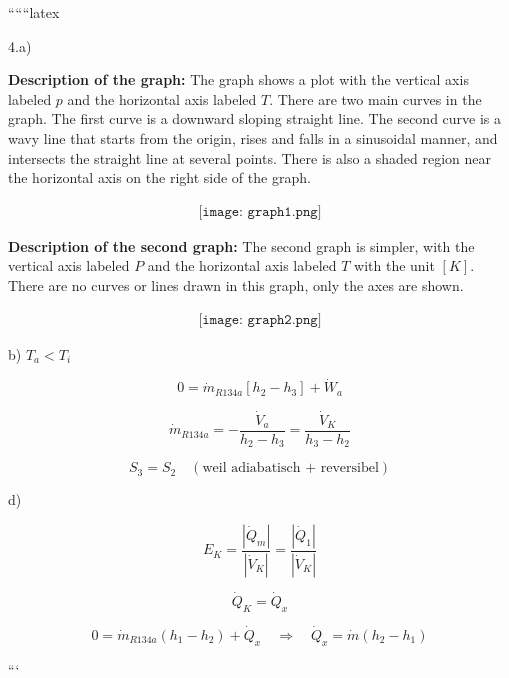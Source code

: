 
``````latex


4.a)

\textbf{Description of the graph:} The graph shows a plot with the vertical axis labeled \( p \) and the horizontal axis labeled \( T \). There are two main curves in the graph. The first curve is a downward sloping straight line. The second curve is a wavy line that starts from the origin, rises and falls in a sinusoidal manner, and intersects the straight line at several points. There is also a shaded region near the horizontal axis on the right side of the graph.

\[
\begin{array}{c}
\texttt{[image: graph1.png]}
\end{array}
\]

\textbf{Description of the second graph:} The second graph is simpler, with the vertical axis labeled \( P \) and the horizontal axis labeled \( T \) with the unit \([K]\). There are no curves or lines drawn in this graph, only the axes are shown.

\[
\begin{array}{c}
\texttt{[image: graph2.png]}
\end{array}
\]

b) \( T_a < T_i \)

\[
0 = \dot{m}_{R134a} \left[ h_2 - h_3 \right] + \dot{W}_a
\]

\[
\dot{m}_{R134a} = -\frac{\dot{V}_a}{h_2 - h_3} = \frac{\dot{V}_K}{h_3 - h_2}
\]

\[
S_3 = S_2 \quad (\text{weil adiabatisch + reversibel})
\]

d)

\[
E_K = \frac{\left| \dot{Q}_m \right|}{\left| \dot{V}_K \right|} = \frac{\left| \dot{Q}_1 \right|}{\left| \dot{V}_K \right|}
\]

\[
\dot{Q}_K = \dot{Q}_x
\]

\[
0 = \dot{m}_{R134a} \left( h_1 - h_2 \right) + \dot{Q}_x \quad \Rightarrow \quad \dot{Q}_x = \dot{m} \left( h_2 - h_1 \right)
\]

```